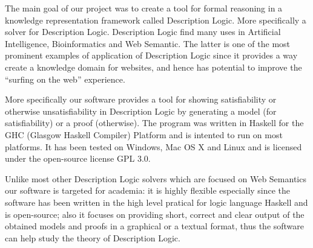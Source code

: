 
The main goal of our project was to create a tool for formal reasoning
in a knowledge representation framework called Description Logic. More specifically a solver for Description Logic. Description Logic find
many uses in Artificial Intelligence, Bioinformatics and Web
Semantic. The latter is one of the most prominent examples of
application of Description Logic since it provides a way create a
knowledge domain for websites, and hence has potential to improve
the ``surfing on the web'' experience.

More specifically our software provides a tool for showing
satisfiability or otherwise unsatisfiability in Description Logic by
generating a model (for satisfiability) or a proof (otherwise). The
program was written in Haskell for the GHC (Glasgow Haskell Compiler)
Platform and is intented to run on most platforms. It has been tested
on Windows, Mac OS X and Linux and is licensed under the open-source
license GPL 3.0.

Unlike most other Description Logic solvers which are focused on Web Semantics
 our software is targeted for academia: it is highly flexible
especially since the software has been written in the high level
pratical for logic language Haskell and is open-source; also it
focuses on providing short, correct and clear output of the obtained
models and proofs in a graphical or a textual format, thus the
software can help study the theory of Description Logic.

